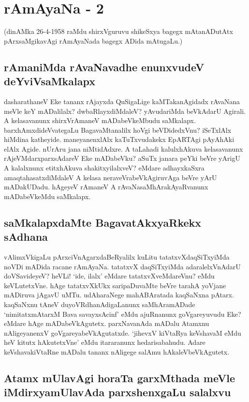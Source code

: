 \chapter{rAmAyaNa - 2}

(dinAMka 26-4-1958 raMdu shirxVguruvu shikeSxya bagegx mAtanADutAtx pArxsaMgikavAgi rAmAyaNada bagegx ADida mAtugaLu.)

\section*{rAmaniMda rAvaNavadhe enunxvudeV deYviVsaMkalapx}

dasharathaneV Eke tananx rAjayxda QuSigaLige kaMTakanAgidadx rAvaNana meVle keY mADalilalx? dwbaRlayxdiMdaleV? yAvudariMda beVkAdarU Agirali. A kelasavanunx  shirxVrAmaneV mADabeVkeMbudu saMkalapx. barxhAmxdideVvategaLu BagavaMtanalilx hoVgi beVDidedxVnu? iSeTxlAlx hiMdina katheyide. maneyanenxlAlx kaTuTxvudakekx EpARTAgi pAyAhAki elAlx Agide. nUrAru jana niMtidAdxre. A taLahadi kalulxhAkuva kelasavanunx rAjeVMdarxparxsAdareV Eke mADabeVku? aSuTx janara peYki beVre yArigU A kalalxnunx etitxhAkuva shakitxyilalxveV? eMdare adhayxkaSxra amaqtahasatxdiMdaleV A kelasa neraveVrabeVkAgiruvAga beVre yArU mADakUDadu. hAgeyeV rAmaneV A rAvaNasaMhArakAyaRvanunx mADabeVkeMdu saMkalapx.

\section*{saMkalapxdaMte BagavatAkxyaRkekx sAdhana}

vAlimxVkigaLu pArxciVnAgarxdaBeRyalilx kuLitu tatatxvXdaqSiTxyiMda noVDi mADida racane rAmAyaNa. tatatxvX daqSiTxyiMda adaralelxVnAdarU doVSavideyeV? heVLi! `ide, ilalx' eMdare tatatxvXveMdareVnu? eMdu keVLutetxVne. hAge tatatxvXkUkx saripaDuvaMte beVre tarahA yoVjane mADiruva jAgavU uMTu. udAharaNege mahABAratada kaqSaNxna pAtarx. kaqSaNxnu tAneV duyoVRdhanAdigaLanunx saMhAramADade `nimitatxmAtarxM Bava savayxsAcinf\label{214a}' eMdu ajuRnanunx goVgareyuvudu Eke? eMdare hAge mADabeVkAgutetx. parxNavanAda mADalu Atamxnu nAligeyanenxV goVgareyabeVkAgutatxde. `jihevxV kiVtaRya keVshavaM\label{214} eMdu heV kitutx hAkutetxVne' eMdu itararanunx hedarisabahudu. Adare keVshavakiVtaRne mADalu tananx nAligege salAmu hAkaleVbeVkAgutetx. 

\section*{Atamx mUlavAgi horaTa garxMthada meVle iMdirxyamUlavAda parxshenxgaLu salalxvu}

